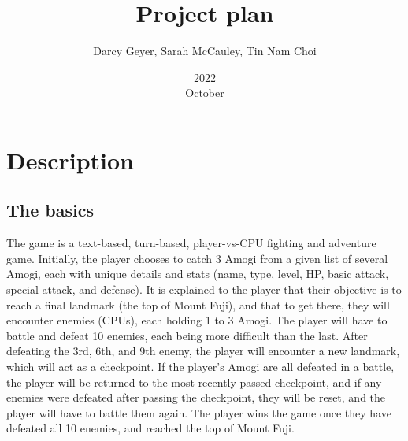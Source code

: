 \documentclass{article}
\title{Project plan}
\author{Darcy Geyer, Sarah McCauley, Tin Nam Choi}
\date{2022\\October}
\begin{document}
  \maketitle{}
  
  \tableofcontents{}
  \setlength{\parindent}{0em}
  \setlength{\parskip}{1em}
  
  \pagebreak
  
  \section{Description}
  
  \subsection{The basics}
  The game is a text-based, turn-based, player-vs-CPU fighting and adventure game. Initially, the player chooses to catch 3 Amogi from a given list of several Amogi, each with unique details and stats (name, type, level, HP, basic attack, special attack, and defense). It is explained to the player that their objective is to reach a final landmark (the top of Mount Fuji), and that to get there, they will encounter enemies (CPUs), each holding 1 to 3 Amogi. The player will have to battle and defeat 10 enemies, each being more difficult than the last. After defeating the 3rd, 6th, and 9th enemy, the player will encounter a new landmark, which will act as a checkpoint. If the player's Amogi are all defeated in a battle, the player will be returned to the most recently passed checkpoint, and if any enemies were defeated after passing the checkpoint, they will be reset, and the player will have to battle them again. The player wins the game once they have defeated all 10 enemies, and reached the top of Mount Fuji.
  
\end{document}
